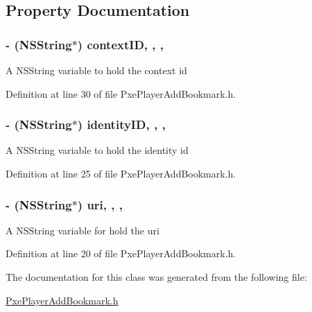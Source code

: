 \subsection{Property Documentation}
\hypertarget{interface_pxe_player_add_bookmark_ad6cd116d2ff48911fa8ecc561072e9b5}{
\subsubsection[{context\-I\-D}]{\setlength{\rightskip}{0pt plus 5cm}-\/ (N\-S\-String$\ast$) context\-I\-D\hspace{0.3cm}{\ttfamily [read]}, {\ttfamily [write]}, {\ttfamily [nonatomic]}, {\ttfamily [strong]}}}\label{interface_pxe_player_add_bookmark_ad6cd116d2ff48911fa8ecc561072e9b5}
A N\-S\-String variable to hold the context id 

Definition at line 30 of file Pxe\-Player\-Add\-Bookmark.\-h.

\hypertarget{interface_pxe_player_add_bookmark_a43618fee5cf82e2461f50948277e5f1a}{
\subsubsection[{identity\-I\-D}]{\setlength{\rightskip}{0pt plus 5cm}-\/ (N\-S\-String$\ast$) identity\-I\-D\hspace{0.3cm}{\ttfamily [read]}, {\ttfamily [write]}, {\ttfamily [nonatomic]}, {\ttfamily [strong]}}}\label{interface_pxe_player_add_bookmark_a43618fee5cf82e2461f50948277e5f1a}
A N\-S\-String variable to hold the identity id 

Definition at line 25 of file Pxe\-Player\-Add\-Bookmark.\-h.

\hypertarget{interface_pxe_player_add_bookmark_a892615c32c37e6c4a5a978fc0898de2f}{
\subsubsection[{uri}]{\setlength{\rightskip}{0pt plus 5cm}-\/ (N\-S\-String$\ast$) uri\hspace{0.3cm}{\ttfamily [read]}, {\ttfamily [write]}, {\ttfamily [nonatomic]}, {\ttfamily [strong]}}}\label{interface_pxe_player_add_bookmark_a892615c32c37e6c4a5a978fc0898de2f}
A N\-S\-String variable for hold the uri 

Definition at line 20 of file Pxe\-Player\-Add\-Bookmark.\-h.



The documentation for this class was generated from the following file\-:\begin{DoxyCompactItemize}
\item 
\hyperlink{_pxe_player_add_bookmark_8h}{Pxe\-Player\-Add\-Bookmark.\-h}\end{DoxyCompactItemize}
